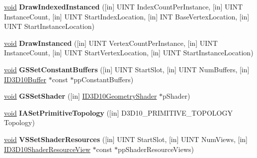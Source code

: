 \begin{DoxyCompactItemize}
\hyperlink{interfacevoid}{void} {\bfseries Draw\+Indexed\+Instanced} (\mbox{[}in\mbox{]} U\+I\+NT Index\+Count\+Per\+Instance, \mbox{[}in\mbox{]} U\+I\+NT Instance\+Count, \mbox{[}in\mbox{]} U\+I\+NT Start\+Index\+Location, \mbox{[}in\mbox{]} I\+NT Base\+Vertex\+Location, \mbox{[}in\mbox{]} U\+I\+NT Start\+Instance\+Location)
\item 
\mbox{\label{interface_i_d3_d10_device_a2d643bbfa1513e132dcf6d73f713c8ca}} 
\hyperlink{interfacevoid}{void} {\bfseries Draw\+Instanced} (\mbox{[}in\mbox{]} U\+I\+NT Vertex\+Count\+Per\+Instance, \mbox{[}in\mbox{]} U\+I\+NT Instance\+Count, \mbox{[}in\mbox{]} U\+I\+NT Start\+Vertex\+Location, \mbox{[}in\mbox{]} U\+I\+NT Start\+Instance\+Location)
\item 
\mbox{\label{interface_i_d3_d10_device_a1564ebf0b79ad096db7cd2f90f477c3d}} 
\hyperlink{interfacevoid}{void} {\bfseries G\+S\+Set\+Constant\+Buffers} (\mbox{[}in\mbox{]} U\+I\+NT Start\+Slot, \mbox{[}in\mbox{]} U\+I\+NT Num\+Buffers, \mbox{[}in\mbox{]} \hyperlink{interface_i_d3_d10_buffer}{I\+D3\+D10\+Buffer} $\ast$const $\ast$pp\+Constant\+Buffers)
\item 
\mbox{\label{interface_i_d3_d10_device_a9c569864c951aaf2bf0c5336f6e57f22}} 
\hyperlink{interfacevoid}{void} {\bfseries G\+S\+Set\+Shader} (\mbox{[}in\mbox{]} \hyperlink{interface_i_d3_d10_geometry_shader}{I\+D3\+D10\+Geometry\+Shader} $\ast$p\+Shader)
\item 
\mbox{\label{interface_i_d3_d10_device_a1ca37c9362ab3447b1480888cebd4a13}} 
\hyperlink{interfacevoid}{void} {\bfseries I\+A\+Set\+Primitive\+Topology} (\mbox{[}in\mbox{]} D3\+D10\+\_\+\+P\+R\+I\+M\+I\+T\+I\+V\+E\+\_\+\+T\+O\+P\+O\+L\+O\+GY Topology)
\item 
\mbox{\label{interface_i_d3_d10_device_ad00d2036eba678f6098fe33d7808102f}} 
\hyperlink{interfacevoid}{void} {\bfseries V\+S\+Set\+Shader\+Resources} (\mbox{[}in\mbox{]} U\+I\+NT Start\+Slot, \mbox{[}in\mbox{]} U\+I\+NT Num\+Views, \mbox{[}in\mbox{]} \hyperlink{interface_i_d3_d10_shader_resource_view}{I\+D3\+D10\+Shader\+Resource\+View} $\ast$const $\ast$pp\+Shader\+Resource\+Views)
\item 
\mbox{\label{interface_i_d3_d10_device_aac987ad806a2d1056475801b7aa2832b}} 

\end{DoxyCompactItemize}
